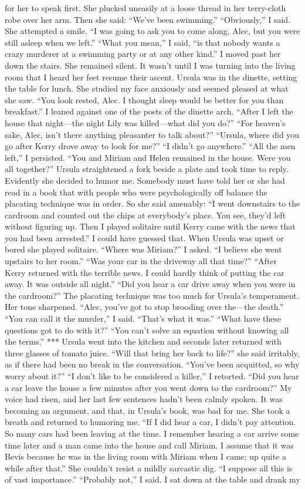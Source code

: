 \documentclass{novel}
\begin{document}
for her to speak first. She plucked uneasily at a loose thread in her terry-cloth robe over her arm. Then she said: “We’ve been swimming.” “Obviously,” I said. She attempted a smile. “I was going to ask you to come along, Alec, but you were still asleep when we left.” “What you mean,” I said, “is that nobody wants a crazy murderer at a swimming party or at any other kind.” I moved past her down the stairs. She remained silent. It wasn’t until I was turning into the living room that I heard her feet resume their ascent. Ursula was in the dinette, setting the table for lunch. She studied my face anxiously and seemed pleased at what she saw. “You look rested, Alec. I thought sleep would be better for you than breakfast.” I leaned against one of the posts of the dinette arch. “After I left the house that night—the night Lily was killed—what did you do?” “For heaven’s sake, Alec, isn’t there anything pleasanter to talk about?” “Ursula, where did you go after Kerry drove away to look for me?” “I didn’t go anywhere.” “All the men left,” I persisted. “You and Miriam and Helen remained in the house. Were you all together?” Ursula straightened a fork beside a plate and took time to reply. Evidently she decided to humor me. Somebody must have told her or she had read in a book that with people who were psychologically off balance the placating technique was in order. So she said amenably: “I went downstairs to the cardroom and counted out the chips at everybody’s place. You see, they’d left without figuring up. Then I played solitaire until Kerry came with the news that you had been arrested.” I could have guessed that. When Ursula was upset or bored she played solitaire. “Where was Miriam?” I asked. “I believe she went upstairs to her room.” “Was your car in the driveway all that time?” “After Kerry returned with the terrible news. I could hardly think of putting the car away. It was outside all night.” “Did you hear a car drive away when you were in the cardroom?” The placating technique was too much for Ursula’s temperament. Her tone sharpened. “Alec, you’ve got to stop brooding over the—the death.” “You can call it the murder,” I said. “That’s what it was.” “What have these questions got to do with it?” “You can’t solve an equation without knowing all the terms.” *** Ursula went into the kitchen and seconds later returned with three glasses of tomato juice. “Will that bring her back to life?” she said irritably, as if there had been no break in the conversation. “You’ve been acquitted, so why worry about it?” “I don’t like to be considered a killer,” I retorted. “Did you hear a car leave the house a few minutes after you went down to the cardroom?” My voice had risen, and her last few sentences hadn’t been calmly spoken. It was becoming an argument, and that, in Ursula’s book, was bad for me. She took a breath and returned to humoring me. “If I did hear a car, I didn’t pay attention. So many cars had been leaving at the time. I remember hearing a car arrive some time later and a man came into the house and call Miriam. I assume that it was Bevis because he was in the living room with Miriam when I came; up quite a while after that.” She couldn’t resist a mildly sarcastic dig. “I suppose all this is of vast importance.” “Probably not,” I said. I sat down at the table and drank my 
\end{document}
